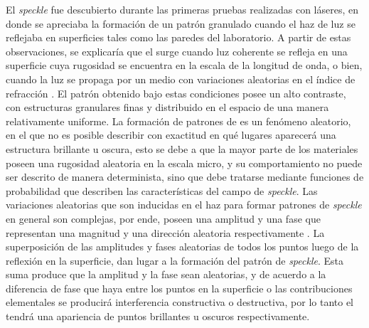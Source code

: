 El \textit{speckle} fue descubierto durante las primeras pruebas realizadas con láseres, en donde se apreciaba la formación de un patrón granulado cuando el haz de luz se reflejaba en superficies tales como las paredes del laboratorio. A partir de estas observaciones, se explicaría que el \speckle surge cuando luz coherente se refleja en una superficie cuya rugosidad se encuentra en la escala de la longitud de onda, o bien, cuando la luz se propaga por un medio con variaciones aleatorias en el índice de refracción \cite{Goodman2010,Dainty1975}. El patrón obtenido bajo estas condiciones posee un alto contraste, con estructuras granulares finas y distribuido en el espacio de una manera relativamente uniforme. La formación de patrones de \speckle es un fenómeno aleatorio, en el que no es posible describir con exactitud en qué lugares aparecerá una estructura brillante u oscura, esto se debe a que la mayor parte de los materiales poseen una rugosidad aleatoria en la escala micro, y su comportamiento no puede ser descrito de manera determinista, sino que debe tratarse mediante funciones de probabilidad que describen las características del campo de \textit{speckle}. Las variaciones aleatorias que son inducidas en el haz para formar patrones de \textit{speckle} en general son complejas, por ende, poseen una amplitud y una fase que representan una magnitud y una dirección aleatoria respectivamente \cite{Goodman1976}. La superposición de las amplitudes y fases aleatorias de todos los puntos luego de la reflexión en la superficie, dan lugar a la formación del patrón de \textit{speckle}. Esta suma produce que la amplitud y la fase sean aleatorias, y de acuerdo a la diferencia de fase que haya entre los puntos en la superficie o las contribuciones elementales se producirá interferencia constructiva o destructiva, por lo tanto el \speckle tendrá una apariencia de puntos brillantes u oscuros respectivamente.


